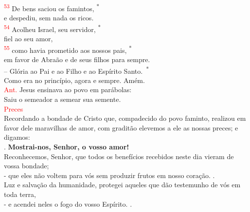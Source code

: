 \documentclass{book}
\begin{document}
\begin{center}
    \textsuperscript{\underline{\hspace{.07in}}\textcolor{red}{53}} De bens saciou os famintos, \textsuperscript{*}\\
    e despediu, sem nada os ricos. \\
    \textsuperscript{\underline{\hspace{.07in}}\textcolor{red}{54}} Acolheu Israel, seu servidor, \textsuperscript{*} \\
    fiel ao seu amor,
    \vspace{.2cm} \\
    \textsuperscript{\underline{\hspace{.07in}}\textcolor{red}{55}} como havia prometido aos nossos pais, \textsuperscript{*} \\
    em favor de Abraão e de seus filhos para sempre.
    \vspace{.2cm} \\
    -- Glória ao Pai e ao Filho e ao Espírito Santo.\ \textsuperscript{*} \\
    Como era no princípio, agora e sempre. Amém.
    \vspace{.2cm} \\
    \textcolor{red}{Ant.} Jesus ensinava ao povo em parábolas: \\
    Saiu o semeador a semear sua semente.
    \vspace{.2cm} \\
    \textcolor{red}{Preces}
    \vspace{.2cm} \\
    Recordando a bondade de Cristo que, compadecido do povo faminto, realizou em favor dele maravilhas de amor, com graditão elevemos a ele as nossas preces; e digamos:
    \vspace{.2cm} \\
    {\color{red} \Rbar.} \textbf{Mostrai-nos, Senhor, o vosso amor!}
    \vspace{.2cm} \\
    Reconhecemos, Senhor, que todos os benefícios recebidos neste dia vieram de vossa bondade; \\
    - que eles não voltem para vós sem produzir frutos em nosso coração.  {\color{red} \Rbar.}
    \vspace{.2cm} \\
    Luz e salvação da humanidade, protegei aqueles que dão testemunho de vós em toda terra, \\
    - e acendei neles o fogo do vosso Espírito. {\color{red} \Rbar.}
    \vspace{.2cm} \\

\end{center}
\end{document}

